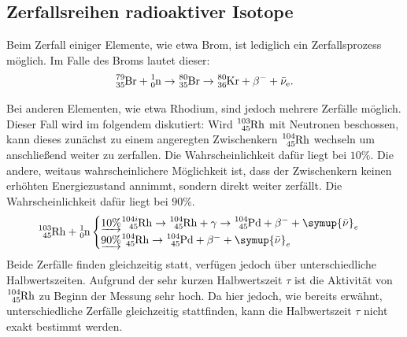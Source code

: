 \subsection{Zerfallsreihen radioaktiver Isotope}
Beim Zerfall einiger Elemente, wie etwa Brom, ist lediglich ein Zerfallsprozess möglich.
Im Falle des Broms lautet dieser:
\begin{equation}
 \ce{^{79}_{35}Br} + \ce{^{1}_{0}n} \rightarrow \ce{^{80}_{35}Br} \rightarrow \ce{^{80}_{36}Kr} +  \beta^- + \bar{\nu}_\text{e} \text{.}
\end{equation}

Bei anderen Elementen, wie etwa Rhodium, sind jedoch mehrere Zerfälle möglich. Dieser Fall wird im folgendem diskutiert:
Wird $\ce{^{103}_{45}Rh}$ mit Neutronen beschossen, kann dieses zunächst zu einem angeregten Zwischenkern $\ce{^{104}_{45}Rh}$ wechseln um anschließend weiter zu zerfallen.
Die Wahrscheinlichkeit dafür liegt bei $10\%$.
Die andere, weitaus wahrscheinlichere Möglichkeit ist, dass der Zwischenkern keinen erhöhten Energiezustand annimmt, sondern direkt weiter zerfällt. Die Wahrscheinlichkeit dafür liegt bei $90\%$.
\begin{equation}
\ce{^{103}_{45}Rh} + \ce{^{1}_{0}n}
\begin{cases}
\underrightarrow{10\%}\ce{^{104i}_{45}Rh}\rightarrow \ce{^{104}_{45}Rh}+ \gamma \rightarrow \ce{^{104}_{45}Pd} + \beta^- + \symup{\bar{\nu}}_e \\
\underrightarrow{90\%}\ce{^{104}_{45}Rh}\rightarrow \ce{^{104}_{45}Pd} + \beta^- + \symup{\bar{\nu}}_e
\end{cases}
\end{equation}
Beide Zerfälle finden gleichzeitig statt, verfügen jedoch über unterschiedliche Halbwertszeiten.
Aufgrund der sehr kurzen Halbwertszeit $\tau$ ist die Aktivität von $\ce{^{104}_{45}Rh}$ zu Beginn der Messung sehr hoch.
Da hier jedoch, wie bereits erwähnt, unterschiedliche Zerfälle gleichzeitig stattfinden, kann die Halbwertszeit $\tau$ nicht exakt bestimmt werden.
